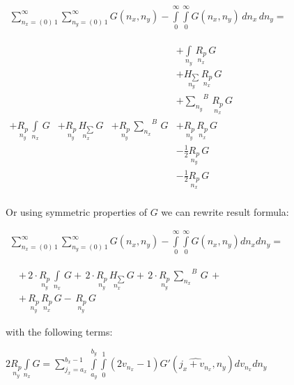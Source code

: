 \documentclass[twoside, 10pt]{article}
\begin{document}
\begin{multicols}{2}
\noindent
    \(\begin{array}{r} \sum\limits_{n_x=\left(0\right)\,1}^{\infty} \sum\limits_{n_y=\left(0\right)\,1}^{\infty} G\left(n_x, n_y\right) - \int\limits_{0}^{\infty} \int\limits_{0}^{\infty} G\left(n_x, n_y\right)\,d{n_x}\,d{n_y} = \end{array}\)

    \(\begin{array}{llll}  \,&  \,&  \,&  + \int\limits_{n_y}^{}\,\underset{n_x}{R_{p}}\,G \\  \,&  \,&  \,&  + \underset{n_y}{H_{\sum}}\,\underset{n_x}{R_{p}}\,G \\  \,&  \,&  \,&  + {\sum\limits_{n_y}^{}}^{B}\,\underset{n_x}{R_{p}}\,G \\  + \underset{n_y}{R_{p}}\,\int\limits_{n_x}^{}\,G &  + \underset{n_y}{R_{p}}\,\underset{n_x}{H_{\sum}}\,G &  + \underset{n_y}{R_{p}}\,{\sum\limits_{n_x}^{}}^{B}\,G &  + \underset{n_y}{R_{p}}\,\underset{n_x}{R_{p}}\,G \\  \,&  \,&  \,&  - \frac{1}{2}\underset{n_y}{R_{p}}\,G \\  \,&  \,&  \,&  - \frac{1}{2}\underset{n_x}{R_{p}}\,G \\ \end{array}\)

    Or using symmetric properties of \(G\) we can rewrite result formula:

\noindent
    \(\begin{array}{r} \sum\limits_{n_x=\left(0\right)\,1}^{\infty} \sum\limits_{n_y=\left(0\right)\,1}^{\infty} G\left(n_x, n_y\right) - \int\limits_{0}^{\infty} \int\limits_{0}^{\infty} G\left(n_x, n_y\right) d{n_x} d{n_y} = \end{array}\)

    \(\begin{array}{rr}
\, & +\,2\cdot\underset{n_y}{R_{p}}\,\int\limits_{n_x}^{}\,G +\,2\cdot\underset{n_y}{R_{p}}\,\underset{n_x}{H_{\sum}}\,G +\,2\cdot\underset{n_y}{R_{p}}\,{\sum\limits_{n_x}^{}}^{B}\,G\,+ \\
\, & +\,\underset{n_y}{R_{p}}\,\underset{n_x}{R_{p}}\,G -\,\underset{n_y}{R_{p}}\,G
\end{array}\)

    with the following terms:

\noindent
\(2 \underset{n_y}{R_{p}}\int\limits_{n_x}^{} G = {\sum\limits_{j_{x}=a_{x}}^{b_{x} - 1} \int\limits_{a_{y}}^{b_{y}} \int\limits_{0}^{1} {\left(2 v_{n_{x}} - 1\right)} G'\left(\widehat{j_{x} + v_{n_{x}}}, n_{y}\right) {d v_{n_{x}}} {d n_{y}}}\)


\end{multicols}
\end{document}
